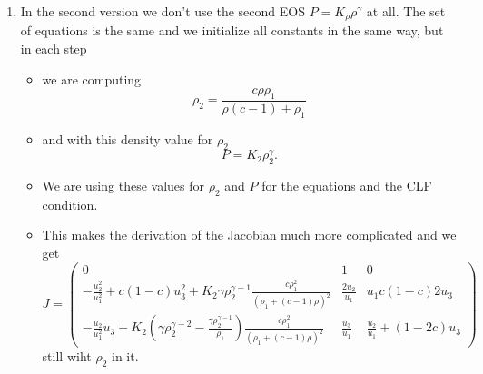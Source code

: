 \documentclass{article}
\begin{document}
\begin{enumerate}
\item In the second version we don't use the second EOS $P = K_\rho
  \rho^{\gamma}$ at all. The set of equations is the same and we
  initialize all constants in the same way, but in each step
  \begin{itemize}
  \item we are computing
    \[
    \rho_2 = \frac{c\rho \rho_1}{\rho (c-1) + \rho_1}
    \]
  \item and with this density value for $\rho_2$
    \[
    P = K_2 \rho_2^\gamma.
    \]
  \item We are using these values for $\rho_2$ and $P$ for the
    equations and the CLF condition.
  \item This makes the derivation of the
    Jacobian much more complicated and we get
  \begin{equation}
    J = \left(\begin{array}{ccc}
      0 & 1 & 0\\[3mm]
      - \frac{u_2^2}{u_1^2} + c (1-c) u_3^2  + 
      K_2 \gamma \rho_2^{\gamma-1} \frac{c\rho_1^2}
      {(\rho_1 + (c - 1)\rho)^2}
      & \frac{2 u_2}{u_1}  &  u_1 c (1-c) 2 u_3  \\[3mm]
      - \frac{u_2}{u_1^2} u_3 + K_2 
      \left(\gamma\rho_2^{\gamma-2} -
      \frac{\gamma\rho_2^{\gamma-1}}{\rho_1}\right)\frac{c\rho_1^2}
           {(\rho_1 + (c - 1)\rho)^2}
           &   \frac{u_3}{u_1}  &  
           \frac{u_2}{u_1} + (1-2c) u_3 
    \end{array}\right)\label{eq:jacobi_v2}
  \end{equation}
  still wiht $\rho_2$ in it.
  \end{itemize}
  

\end{enumerate}
\end{document}
